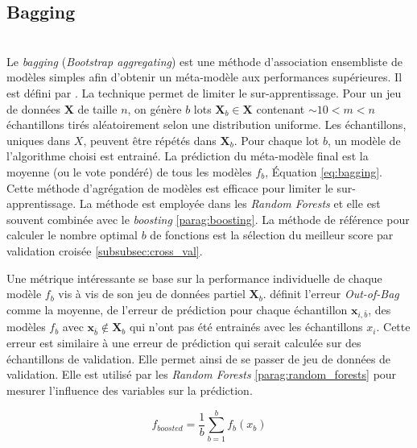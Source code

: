 \subsection{Bagging}\mbox{\label{parag:bagging}} \\
Le \textit{bagging} (\textit{\emph{B}ootstrap \emph{agg}regat\emph{ing}}) est une méthode d'association ensembliste de modèles simples afin d'obtenir un méta-modèle aux performances supérieures.
Il est défini par \citeauthor{breiman_bagging_1996} \cite{breiman_bagging_1996}.
La technique permet de limiter le sur-apprentissage.
Pour un jeu de données $\mathbf{X}$ de taille $n$, on génère $b$ lots $\mathbf{X}_b \in \mathbf{X}$ contenant $\sim 10 < m < n$ échantillons tirés aléatoirement selon une distribution uniforme.
Les échantillons, uniques dans $X$, peuvent être répétés dans $\mathbf{X}_b$.
Pour chaque lot $b$, un modèle de l'algorithme choisi est entrainé.
La prédiction du méta-modèle final est la moyenne (ou le vote pondéré) de tous les modèles $f_b$, Équation \ref{eq:bagging}.
Cette méthode d'agrégation de modèles est efficace pour limiter le sur-apprentissage.
La méthode est employée dans les \textit{Random Forests} et elle est souvent combinée avec le \textit{boosting} \ref{parag:boosting}.
La méthode de référence pour calculer le nombre optimal $b$ de fonctions est la sélection du meilleur score par validation croisée \ref{subsubsec:cross_val}.

Une métrique intéressante se base sur la performance individuelle de chaque modèle $f_b$ vis à vis de son jeu de données partiel $\mathbf{X}_b$.
\citeauthor{breiman_bagging_1996} \cite{breiman_bagging_1996} définit l'erreur \textit{Out-of-Bag} comme la moyenne, de l'erreur de prédiction pour chaque échantillon $\mathbf{x}_{i,\bar{b}}$, des modèles $f_b$ avec $ \mathbf{x}_{\bar{b}} \notin \mathbf{X}_b$ qui n'ont pas été entrainés avec les échantillons $x_i$.
Cette erreur est similaire à une erreur de prédiction qui serait calculée sur des échantillons de validation.
Elle permet ainsi de se passer de jeu de données de validation.
Elle est utilisé par les \textit{Random Forests} \ref{parag:random_forests} pour mesurer l'influence des variables sur la prédiction.

\begin{equation} \label{eq:bagging}
f_{boosted} = \frac{1}{b} \sum_{b=1}^{b} f_{b}\left(x_b\right)
\end{equation}

